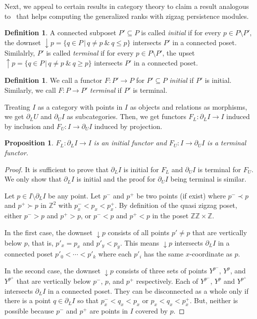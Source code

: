 \documentclass{article}
\newcommand{\zz}{\mathbb{ZZ}}
\newcommand{\z}{\mathbb{Z}}
\theoremstyle{plain}
\newtheorem{proposition}[theorem]{Proposition}
\theoremstyle{definition}
\newtheorem{definition}[theorem]{Definition}
\theoremstyle{remark}
\begin{document}
Next, we appeal to certain results in category theory to claim a result
analogous to~\cite{DKM24} that helps computing the generalized ranks with
zigzag persistence modules. 

\begin{definition}
    A connected subposet $P'\subseteq P$ is called \emph{initial} if for every $p\in P\setminus P'$,
    the downset $\downarrow{p}=\{q\in P\,| \, q\neq p~\&~ q\leq p\}$ intersects $P'$
    in a connected poset. Similalrly, $P'$ is called \emph{terminal} if for every $p\in P\setminus P'$, the upset $\uparrow {p}=\{q\in P\,| \, q\neq p~\&~ q\geq p\}$ intersects $P'$
    in a connected poset.
\end{definition}

\begin{definition}
    \label{adef:init_functors}
    We call a functor $F: P'\rightarrow P$ for $P'\subseteq P$ \emph{initial} if $P'$ is initial.
Similarly, we call $F: P\rightarrow P'$ \emph{terminal} if $P'$ is terminal.
\end{definition}

Treating $I$ as a category with points in $I$ as objects and relations as morphisms, we get $\partial_LU$ and $\partial_UI$ as subcategories. Then, we get functors $F_L \colon \partial_LI \to I$ induced by inclusion and $F_U \colon I \to \partial_UI $ induced by projection.

\begin{proposition}
\label{aprop:init_functor}
    $F_L: \partial_L I\rightarrow I$  is an initial functor and $F_U: I\rightarrow \partial_U I$ is a terminal functor.
\end{proposition}
\begin{proof}
    It is sufficient to prove that $\partial_L I$ is initial for $F_L$ and $\partial_U I$ is terminal for $F_U$. We only show that $\partial_L I$ is initial and the proof
    for $\partial_U I$ being terminal is similar.

    Let $p\in I\setminus \partial_L I$ be any point. Let $p^-$ and $p^+$ be two points (if exist) where $p^-\prec p$ and $p^+ \succ p$ in $\z^2$ with $p^-_x < p_x < p^+_x$. By definition of the quasi zigzag poset, either $p^- > p$ and $p^+ > p$, or $p^- < p$ and
    $p^+ < p$ in the poset $\zz\times \z$.
    
    
    In the first
    case, the downset $\downarrow p$ consists of all points $p'\neq p$ that are vertically below $p$, that is, 
    $p'_x=p_x$ and $p'_y< p_y$. This means $\downarrow p$ intersects $\partial_L I$
    in a connected poset $p'_0 <\cdots < p'_k$ where each $p'_i$ has the same $x$-coordinate as $p$.

    In the second case, the downset $\downarrow p$ consists of three sets of points $Y^{p^-}$, $Y^p$, and $Y^{p^+}$  
    that are vertically below $p^-$, $p$, and $p^+$ respectively. Each of $Y^{p^-}$,
    $Y^p$ and $Y^{p^+}$ intersects $\partial_L I$ in a connected poset. They can be
    disconnected as a whole only if there is a point $q\in \partial_L I$ 
    so that
    $p^-_x < q_x < p_x$ or $p_x < q_x < p^+_x$. But, neither is possible because
    $p^-$ and $p^+$ are points in $I$ covered by $p$.    
\end{proof}
\end{document}
